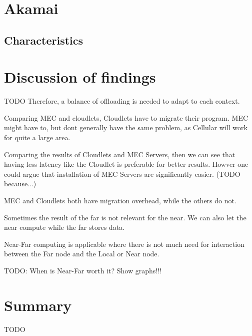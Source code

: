 




\section{Akamai}
\subsection{Characteristics}








\section{Discussion of findings}
TODO
Therefore, a balance of offloading is needed to adapt to each context.
 
Comparing MEC and cloudlets, Cloudlets have to migrate their program. MEC might have to, but dont generally have the same problem, as Cellular will work for quite a large area.

Comparing the results of Cloudlets and MEC Servers, then we can see that having less latency like the Cloudlet is preferable for better results. Howver one could argue that installation of MEC Servers are significantly easier. (TODO because...)


MEC and Cloudlets both have migration overhead, while the others do not.

Sometimes the result of the far is not relevant for the near. We can also let the near compute while the far stores data.

Near-Far computing is applicable where there is not much need for interaction between the Far node and the Local or Near node.


TODO: When is Near-Far worth it? Show graphs!!!

\section{Summary}
TODO
